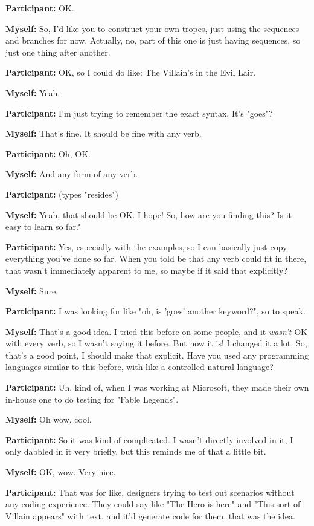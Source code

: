 \documentclass[11pt]{report}
\begin{document}
\begin{linenumbers}
\textbf{Participant:} OK.

\textbf{Myself:} So, I'd like you to construct your own tropes, just using the sequences and branches for now. Actually, no, part of this one is just having sequences, so just one thing after another.

\textbf{Participant:} OK, so I could do like: The Villain's in the Evil
Lair.

\textbf{Myself:} Yeah.

\textbf{Participant:} I'm just trying to remember the exact syntax. It's
"goes"?

\textbf{Myself:} That's fine. It should be fine with any verb.

\textbf{Participant:} Oh, OK.

\textbf{Myself:} And any form of any verb.

\textbf{Participant:} (types "resides")

\textbf{Myself:} Yeah, that should be OK. I hope! So, how are you finding this? Is it easy to learn so far?

\textbf{Participant:} Yes, especially with the examples, so I can basically just copy everything you've done so far. When you told be that any verb could fit in there, that wasn't immediately apparent to me, so maybe if it said that explicitly?

\textbf{Myself:} Sure.

\textbf{Participant:} I was looking for like "oh, is 'goes' another keyword?", so to speak.

\textbf{Myself:} That's a good idea. I tried this before on some people, and it \emph{wasn't} OK with every verb, so I wasn't saying it before. But now it is! I changed it a lot. So, that's a good point, I should make that explicit. Have you used any programming languages similar to this before, with like a controlled natural language?

\textbf{Participant:} Uh, kind of, when I was working at Microsoft, they made their own in-house one to do testing for "Fable Legends".

\textbf{Myself:} Oh wow, cool.

\textbf{Participant:} So it was kind of complicated. I wasn't directly involved in it, I only dabbled in it very briefly, but this reminds me of that a little bit.

\textbf{Myself:} OK, wow. Very nice.

\textbf{Participant:} That was for like, designers trying to test out scenarios without any coding experience. They could say like "The Hero is here" and "This sort of Villain appears" with text, and it'd generate code for them, that was the idea.


\end{linenumbers}
\end{document}
